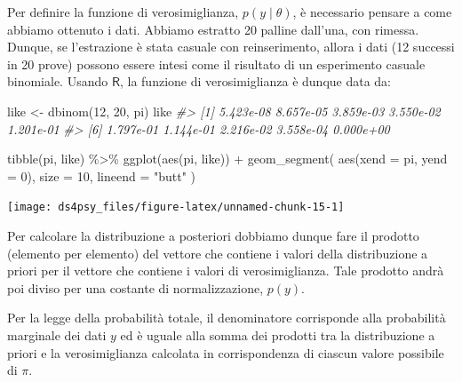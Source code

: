 \documentclass[
  11pt,
]{krantz}
\makeatletter
\newenvironment{Shaded}{\begin{snugshade}}{\end{snugshade}}
\newcommand{\AttributeTok}[1]{\textcolor[rgb]{0.61,0.61,0.61}{#1}}
\newcommand{\CommentTok}[1]{\textcolor[rgb]{0.37,0.37,0.37}{\textit{#1}}}
\newcommand{\DecValTok}[1]{\textcolor[rgb]{0.06,0.06,0.06}{#1}}
\newcommand{\FunctionTok}[1]{\textcolor[rgb]{0,0,0}{#1}}
\newcommand{\NormalTok}[1]{#1}
\newcommand{\OtherTok}[1]{\textcolor[rgb]{0.37,0.37,0.37}{#1}}
\newcommand{\SpecialCharTok}[1]{\textcolor[rgb]{0,0,0}{#1}}
\newcommand{\StringTok}[1]{\textcolor[rgb]{0.5,0.5,0.5}{#1}}
\newenvironment{kframe}{%
\medskip{}
\setlength{\fboxsep}{.8em}
 \def\at@end@of@kframe{}%
 \ifinner\ifhmode%
  \def\at@end@of@kframe{\end{minipage}}%
  \begin{minipage}{\columnwidth}%
 \fi\fi%
 \def\FrameCommand##1{\hskip\@totalleftmargin \hskip-\fboxsep
 \colorbox{shadecolor}{##1}\hskip-\fboxsep
     \hskip-\linewidth \hskip-\@totalleftmargin \hskip\columnwidth}%
 \MakeFramed {\advance\hsize-\width
   \@totalleftmargin\z@ \linewidth\hsize
   \@setminipage}}%
 {\par\unskip\endMakeFramed%
 \at@end@of@kframe}
\renewenvironment{Shaded}{\begin{kframe}}{\end{kframe}}
\theoremstyle{definition}
\theoremstyle{definition}
\theoremstyle{definition}
\theoremstyle{definition}
\theoremstyle{remark}
\makeatother
\begin{document}
Per definire la funzione di verosimiglianza, \(p(y \mid \theta)\), è necessario pensare a come abbiamo ottenuto i dati. Abbiamo estratto 20 palline dall'una, con rimessa. Dunque, se l'estrazione è stata casuale con reinserimento, allora i dati (12 successi in 20 prove) possono essere intesi come il risultato di un esperimento casuale binomiale. Usando \(\textsf{R}\), la funzione di verosimiglianza è dunque data da:

\begin{Shaded}
\begin{Highlighting}[]
\NormalTok{like }\OtherTok{\textless{}{-}} \FunctionTok{dbinom}\NormalTok{(}\DecValTok{12}\NormalTok{, }\DecValTok{20}\NormalTok{, pi)}
\NormalTok{like}
\CommentTok{\#\textgreater{}  [1] 5.423e{-}08 8.657e{-}05 3.859e{-}03 3.550e{-}02 1.201e{-}01}
\CommentTok{\#\textgreater{}  [6] 1.797e{-}01 1.144e{-}01 2.216e{-}02 3.558e{-}04 0.000e+00}
\end{Highlighting}
\end{Shaded}

\begin{Shaded}
\begin{Highlighting}[]
\FunctionTok{tibble}\NormalTok{(pi, like) }\SpecialCharTok{\%\textgreater{}\%}
  \FunctionTok{ggplot}\NormalTok{(}\FunctionTok{aes}\NormalTok{(pi, like)) }\SpecialCharTok{+}
  \FunctionTok{geom\_segment}\NormalTok{(}
    \FunctionTok{aes}\NormalTok{(}\AttributeTok{xend =}\NormalTok{ pi, }\AttributeTok{yend =} \DecValTok{0}\NormalTok{),}
    \AttributeTok{size =} \DecValTok{10}\NormalTok{, }\AttributeTok{lineend =} \StringTok{"butt"}
\NormalTok{  )}
\end{Highlighting}
\end{Shaded}

\begin{center}\texttt{[image: ds4psy\_files/figure-latex/unnamed-chunk-15-1]} \end{center}

Per calcolare la distribuzione a posteriori dobbiamo dunque fare il prodotto (elemento per elemento) del vettore che contiene i valori della distribuzione a priori per il vettore che contiene i valori di verosimiglianza. Tale prodotto andrà poi diviso per una costante di normalizzazione, \(p(y)\).

Per la legge della probabilità totale, il denominatore corrisponde alla probabilità marginale dei dati \(y\) ed è uguale alla somma dei prodotti tra la distribuzione a priori e la verosimiglianza calcolata in corrispondenza di ciascun valore possibile di \(\pi\).
\end{document}
